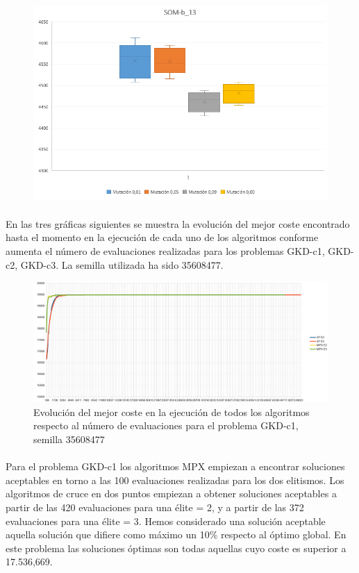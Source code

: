 	\begin{figure}[H]
		
		\centering
		\includegraphics[scale=0.7]{img/BigotesMutacion0SOM_3}
		
	\end{figure}

	\paragraph{} En las tres gráficas siguientes se muestra la evolución del mejor coste encontrado hasta el momento en la ejecución de cada uno de los algoritmos conforme aumenta el número de evaluaciones realizadas para los problemas GKD-c1, GKD-c2, GKD-c3. La semilla utilizada ha sido 35608477.

	\begin{figure}[H]
		\centering
		\includegraphics[scale=0.3]{img/35608477_GKD-c_1_n500_m50.png}
		\caption{Evolución del mejor coste en la ejecución de todos los algoritmos respecto al número de evaluaciones para el problema GKD-c1, semilla 35608477}
		\label{gkd-c1_historico}
	\end{figure}

	\paragraph{}Para el problema GKD-c1 los algoritmos MPX empiezan a encontrar soluciones aceptables en torno a las 100 evaluaciones realizadas para los dos elitismos. Los algoritmos de cruce en dos puntos empiezan a obtener soluciones aceptables a partir de las 420 evaluaciones para una élite = 2, y a partir de las 372 evaluaciones para una élite = 3. Hemos considerado una solución aceptable aquella solución que difiere como máximo un 10\% respecto al óptimo global. En este problema las soluciones óptimas son todas aquellas cuyo coste es superior a 17.536,669.

